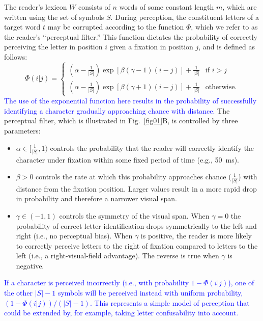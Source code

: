 \documentclass[doc,biblatex]{apa7}
\newcommand\newmaterial[1]{\textcolor{blue}{#1}}
\begin{document}
The reader's lexicon $W$ consists of $n$ words of some constant length $m$, which are written using the set of symbols $S$. During perception, the constituent letters of a target word $t$ may be corrupted according to the function $\Phi$, which we refer to as the reader's ``perceptual filter.'' This function dictates the probability of correctly perceiving the letter in position $i$ given a fixation in position $j$, and is defined as follows:
\begin{equation}
\Phi(i|j) =
\begin{cases}
    (\alpha - \frac{1}{|S|}) \exp [ \beta (\gamma - 1) (i - j) ] + \frac{1}{|S|} & \text{if $i > j$} \\
    (\alpha - \frac{1}{|S|}) \exp [ \beta (\gamma + 1) (i - j) ] + \frac{1}{|S|} & \text{otherwise.}
\end{cases}
\label{eq_filter}
\end{equation}
\newmaterial{The use of the exponential function here results in the probability of successfully identifying a character gradually approaching chance with distance.} The perceptual filter, which is illustrated in Fig.~\ref{fig01}B, is controlled by three parameters:
\begin{itemize}
    \item $\alpha \in [\frac{1}{|S|}, 1)$ controls the probability that the reader will correctly identify the character under fixation within some fixed period of time (e.g., 50~ms).
    \item $\beta > 0$ controls the rate at which this probability approaches chance ($\frac{1}{|S|}$) with distance from the fixation position. Larger values result in a more rapid drop in probability and therefore a narrower visual span.
    \item $\gamma \in (-1, 1)$ controls the symmetry of the visual span. When $\gamma = 0$ the probability of correct letter identification drops symmetrically to the left and right (i.e., no perceptual bias). When $\gamma$ is positive, the reader is more likely to correctly perceive letters to the right of fixation compared to letters to the left (i.e., a right-visual-field advantage). The reverse is true when $\gamma$ is negative.
\end{itemize}
\newmaterial{If a character is perceived incorrectly (i.e., with probability $1 - \Phi(i|j)$), one of the other $|S|-1$ symbols will be perceived instead with uniform probability, $(1 - \Phi(i|j)) / (|S| - 1)$. This represents a simple model of perception that could be extended by, for example, taking letter confusability into account.}
\end{document}
